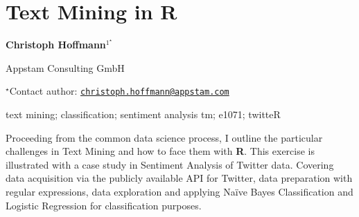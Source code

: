 \documentclass[\main/boa.tex]{subfiles}
\begin{document}
\section{Text Mining in R}

\begin{center}
  {\bf {} Christoph Hoffmann$^{1^\star}$}
\end{center}

\vskip 0.3cm

\begin{affiliations}
\begin{enumerate}
\begin{minipage}{0.915\textwidth}
\centering
\item Appstam Consulting GmbH \\[-2pt]
\end{minipage}
\end{enumerate}
$^\star$Contact author: \href{mailto:christoph.hoffmann@appstam.com}{\nolinkurl{christoph.hoffmann@appstam.com}}\\
\end{affiliations}

\vskip 0.5cm

\begin{minipage}{0.915\textwidth}
\keywords text mining; classification; sentiment analysis
\packages {} tm;  e1071;  twitteR
\end{minipage}

\vskip 0.8cm

Proceeding from the common data science process, I outline the particular challenges in Text Mining and how to face them with \textbf{R}. This exercise is illustrated with a case study in Sentiment Analysis of Twitter data. Covering data acquisition via the publicly available API for Twitter, data preparation with regular expressions, data exploration and applying Naïve Bayes Classification and Logistic Regression for classification purposes.
\end{document}
